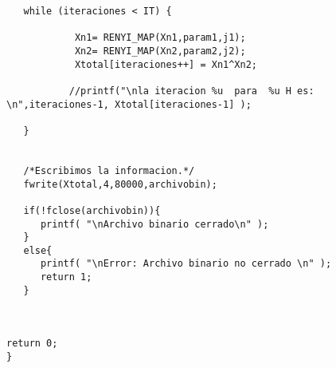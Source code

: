 \documentclass[12pt,3p]{elsarticle}
\begin{document}
\begin{verbatim}
   while (iteraciones < IT) {

            Xn1= RENYI_MAP(Xn1,param1,j1);
            Xn2= RENYI_MAP(Xn2,param2,j2);
            Xtotal[iteraciones++] = Xn1^Xn2;
 
           //printf("\nla iteracion %u  para  %u H es:  \n",iteraciones-1, Xtotal[iteraciones-1] );

   } 
 

   /*Escribimos la informacion.*/
   fwrite(Xtotal,4,80000,archivobin); 

   if(!fclose(archivobin)){
      printf( "\nArchivo binario cerrado\n" );
   }
   else{
      printf( "\nError: Archivo binario no cerrado \n" );
      return 1;
   }  

  

return 0;
}

\end{verbatim}
\end{document}
